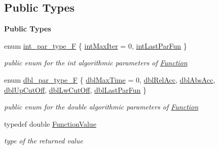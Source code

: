 \subsection*{Public Types}
\begin{Indent}\textbf{ Public Types}\par
\begin{DoxyCompactItemize}
\item 
enum \mbox{\hyperlink{class_s_m_spp__di__unipi__it_1_1_function_a6e928ff7188d46bdb66f31cda302ab06}{int\+\_\+par\+\_\+type\+\_\+F}} \{ \mbox{\hyperlink{class_s_m_spp__di__unipi__it_1_1_function_a6e928ff7188d46bdb66f31cda302ab06a18fd973f71832c25b32393317e4d6eca}{int\+Max\+Iter}} = 0, 
\mbox{\hyperlink{class_s_m_spp__di__unipi__it_1_1_function_a6e928ff7188d46bdb66f31cda302ab06abcd12185e11be88c7ccaaf635c0304f3}{int\+Last\+Par\+Fun}}
 \}
\begin{DoxyCompactList}\small\item\em public enum for the int algorithmic parameters of \mbox{\hyperlink{class_s_m_spp__di__unipi__it_1_1_function}{Function}} \end{DoxyCompactList}\item 
enum \mbox{\hyperlink{class_s_m_spp__di__unipi__it_1_1_function_ad7177cbeb2113eb7a975acec14d13027}{dbl\+\_\+par\+\_\+type\+\_\+F}} \{ \newline
\mbox{\hyperlink{class_s_m_spp__di__unipi__it_1_1_function_ad7177cbeb2113eb7a975acec14d13027acd77e71bf86e7d641a5e571a18efae5a}{dbl\+Max\+Time}} = 0, 
\mbox{\hyperlink{class_s_m_spp__di__unipi__it_1_1_function_ad7177cbeb2113eb7a975acec14d13027a6bafebef661615217b94425419f0d8d2}{dbl\+Rel\+Acc}}, 
\mbox{\hyperlink{class_s_m_spp__di__unipi__it_1_1_function_ad7177cbeb2113eb7a975acec14d13027aafe17e0e4a531284760badf1ad8f34d4}{dbl\+Abs\+Acc}}, 
\mbox{\hyperlink{class_s_m_spp__di__unipi__it_1_1_function_ad7177cbeb2113eb7a975acec14d13027a22be127e17b811416b84944432a35ca5}{dbl\+Up\+Cut\+Off}}, 
\newline
\mbox{\hyperlink{class_s_m_spp__di__unipi__it_1_1_function_ad7177cbeb2113eb7a975acec14d13027adaf90064ffac03f204c43a0adf226f58}{dbl\+Lw\+Cut\+Off}}, 
\mbox{\hyperlink{class_s_m_spp__di__unipi__it_1_1_function_ad7177cbeb2113eb7a975acec14d13027a81691cd64ff74036e01cfe20a1d2b85e}{dbl\+Last\+Par\+Fun}}
 \}
\begin{DoxyCompactList}\small\item\em public enum for the double algorithmic parameters of \mbox{\hyperlink{class_s_m_spp__di__unipi__it_1_1_function}{Function}} \end{DoxyCompactList}\item 
\mbox{\label{class_s_m_spp__di__unipi__it_1_1_function_a9ad432406b609e28d340f73e9474bffe}} 
typedef double \mbox{\hyperlink{class_s_m_spp__di__unipi__it_1_1_function_a9ad432406b609e28d340f73e9474bffe}{Function\+Value}}
\begin{DoxyCompactList}\small\item\em type of the returned value \end{DoxyCompactList}\end{DoxyCompactItemize}
\end{Indent}
